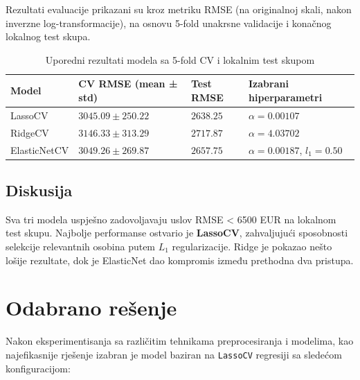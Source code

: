 \documentclass[a4paper,12pt]{article}
\begin{document}
Rezultati evaluacije prikazani su kroz metriku RMSE (na originalnoj skali, nakon inverzne log-transformacije), na osnovu 5-fold unakrsne validacije i konačnog lokalnog test skupa.

\begin{table}[H]
\centering
\caption{Uporedni rezultati modela sa 5-fold CV i lokalnim test skupom}
\label{tab:modeli}
\begin{tabularx}{\textwidth}{l >{\centering\arraybackslash}X >{\centering\arraybackslash}X >{\centering\arraybackslash}X}
\toprule
\textbf{Model} & \textbf{CV RMSE (mean ± std)} & \textbf{Test RMSE} & \textbf{Izabrani hiperparametri} \\
\midrule
LassoCV & $3045.09 \pm 250.22$ & $2638.25$ & $\alpha = 0.00107$ \\
RidgeCV & $3146.33 \pm 313.29$ & $2717.87$ & $\alpha = 4.03702$ \\
ElasticNetCV & $3049.26 \pm 269.87$ & $2657.75$ & $\alpha = 0.00187$, $l_1 = 0.50$ \\
\bottomrule
\end{tabularx}
\end{table}

\subsection{Diskusija}

Sva tri modela uspješno zadovoljavaju uslov RMSE < 6500 EUR na lokalnom  test skupu. Najbolje performanse ostvario je \textbf{LassoCV}, zahvaljujući sposobnosti selekcije relevantnih osobina putem $L_1$ regularizacije. Ridge je pokazao nešto lošije rezultate, dok je ElasticNet dao kompromis između prethodna dva pristupa.

\section{Odabrano rešenje}

Nakon eksperimentisanja sa različitim tehnikama preprocesiranja i modelima, kao najefikasnije rješenje izabran je model baziran na \texttt{LassoCV} regresiji sa sledećom konfiguracijom:
\end{document}

